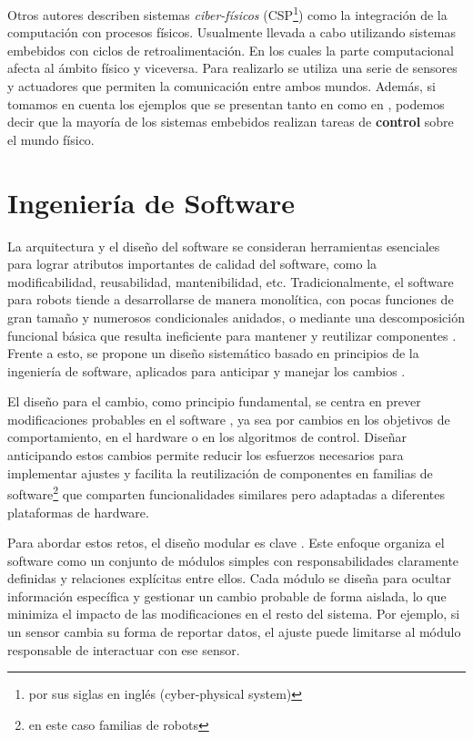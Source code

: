Otros autores \cite{lee2017introduction} describen sistemas \textit{ciber-físicos} (CSP\footnote{por sus siglas en inglés (cyber-physical system)}) como la integración de la computación con procesos físicos. Usualmente llevada a cabo utilizando sistemas embebidos con ciclos de retroalimentación. En los cuales la parte computacional afecta al ámbito físico y viceversa. Para realizarlo se utiliza una serie de sensores y actuadores que permiten la comunicación entre ambos mundos.
Además, si tomamos en cuenta los ejemplos que se presentan tanto en \cite{noergaard2005embedded} como en \cite{lee2017introduction}, podemos decir que la mayoría de los sistemas embebidos realizan tareas de \textbf{control} sobre el mundo físico.


\section{Ingeniería de Software}

La arquitectura y el diseño del software se consideran herramientas esenciales para lograr atributos importantes de calidad del software, como la modificabilidad, reusabilidad, mantenibilidad, etc.\cite{ShawGarlan1996, ghezzi2003, bass2003, DBLP:books/daglib/0030743}
Tradicionalmente, el software para robots tiende a desarrollarse de manera monolítica, con pocas funciones de gran tamaño y numerosos condicionales anidados, o mediante una descomposición funcional básica que resulta ineficiente para mantener y reutilizar componentes \cite{code-1,code-2}. Frente a esto, se propone un diseño sistemático basado en principios de la ingeniería de software, aplicados para anticipar y manejar los cambios \cite{Gamma:1995:DPE:186897, DBLP:books/lib/BuschmannHS07}.

El diseño para el cambio, como principio fundamental, se centra en prever modificaciones probables en el software \cite{Parnas1972, ShawGarlan1996, ghezzi2003, bass2003, DBLP:books/daglib/0030743}, ya sea por cambios en los objetivos de comportamiento, en el hardware o en los algoritmos de control. Diseñar anticipando estos cambios permite reducir los esfuerzos necesarios para implementar ajustes y facilita la reutilización de componentes en familias de software\footnote{en este caso familias de robots} que comparten funcionalidades similares pero adaptadas a diferentes plataformas de hardware\cite{Parnas02, DBLP:books/daglib/0019719}.

Para abordar estos retos, el diseño modular es clave \cite{Parnas1972}. Este enfoque organiza el software como un conjunto de módulos simples con responsabilidades claramente definidas y relaciones explícitas entre ellos. Cada módulo se diseña para ocultar información específica y gestionar un cambio probable de forma aislada, lo que minimiza el impacto de las modificaciones en el resto del sistema. Por ejemplo, si un sensor cambia su forma de reportar datos, el ajuste puede limitarse al módulo responsable de interactuar con ese sensor.

